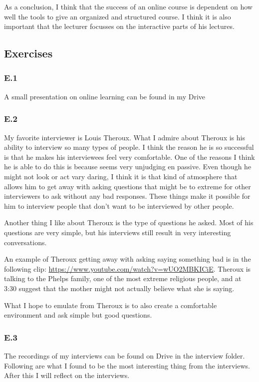 \documentclass[]{article}
\begin{document}
As a conclusion, I think that the success of an online course is dependent on how 
well the tools to give an organized and structured course. I think it is also important
that the lecturer focusses on the interactive parts of his lectures. 

\subsection*{Exercises}

\subsubsection*{E.1}
A small presentation on online learning can be found in my Drive

\subsubsection*{E.2}
My favorite interviewer is Louis Theroux. What I admire about Theroux is his 
ability to interview so many types of people. I think the reason he is so successful
is that he makes his interviewees feel very comfortable. One of the reasons I think 
he is able to do this is because seems very unjudging en passive. Even though he 
might not look or act vary daring, I think it is that kind of atmosphere that 
allows him to get away with asking questions that might be to extreme for other
interviewers to ask without any bad responses. These things make it possible for 
him to interview people that don't want to be interviewed by other people.

Another thing I like about Theroux is the type of questions he asked. Most 
of his questions are very simple, but his interviews still result in very 
interesting conversations. 

An example of Theroux getting away with asking saying something bad is in the following clip:
\url{https://www.youtube.com/watch?v=wUO2MBKICiE}.
Theroux is talking to the Phelps family, one of the most extreme religious people,
and at 3:30 suggest that the mother might not actually believe what she is saying.

What I hope to emulate from Theroux is to also create a comfortable environment
and ask simple but good questions. 

\subsubsection*{E.3}
The recordings of my interviews can be found on Drive in the interview folder. 
Following are what I found to be the most interesting thing from the interviews.
After this I will reflect on the interviews. 
\end{document}
